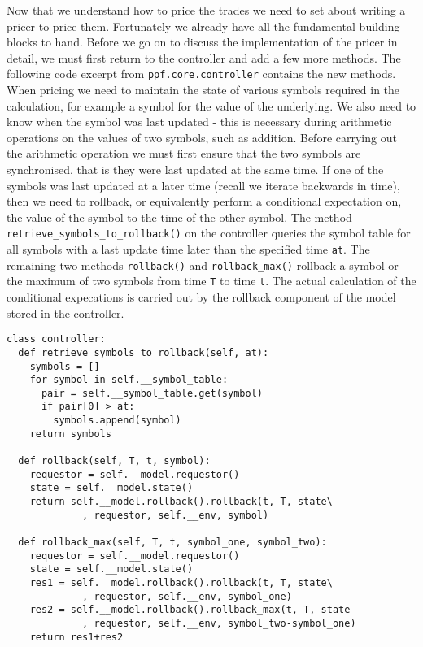 Now that we understand how to price the trades we need to set about
writing a pricer to price them. Fortunately we already have all the
fundamental building blocks to hand. Before we go on to discuss the
implementation of the pricer in detail, we must first return to the
controller and add a few more methods. The following code excerpt from
\verb|ppf.core.controller| contains the new methods. When pricing we
need to maintain the state of various symbols required in the
calculation, for example a symbol for the value of the underlying. We
also need to know when the symbol was last updated - this is necessary
during arithmetic operations on the values of two symbols, such as
addition. Before carrying out the arithmetic operation we must first
ensure that the two symbols are synchronised, that is they were last
updated at the same time. If one of the symbols was last updated at a
later time (recall we iterate backwards in time), then we need to
rollback, or equivalently perform a conditional expectation on, the
value of the symbol to the time of the other symbol. The method
\verb|retrieve_symbols_to_rollback()| on the controller queries the
symbol table for all symbols with a last update time later than the
specified time \verb|at|.  The remaining two methods \verb|rollback()|
and \verb|rollback_max()| rollback a symbol or the maximum of two
symbols from time \verb|T| to time \verb|t|. The actual calculation of
the conditional expecations is carried out by the rollback component
of the model stored in the controller.

\begin{verbatim}
class controller:
  def retrieve_symbols_to_rollback(self, at):
    symbols = []
    for symbol in self.__symbol_table:
      pair = self.__symbol_table.get(symbol)
      if pair[0] > at:
        symbols.append(symbol)
    return symbols

  def rollback(self, T, t, symbol):
    requestor = self.__model.requestor()
    state = self.__model.state()
    return self.__model.rollback().rollback(t, T, state\
             , requestor, self.__env, symbol)

  def rollback_max(self, T, t, symbol_one, symbol_two):
    requestor = self.__model.requestor()
    state = self.__model.state()
    res1 = self.__model.rollback().rollback(t, T, state\
             , requestor, self.__env, symbol_one)
    res2 = self.__model.rollback().rollback_max(t, T, state
             , requestor, self.__env, symbol_two-symbol_one)
    return res1+res2
\end{verbatim} 

